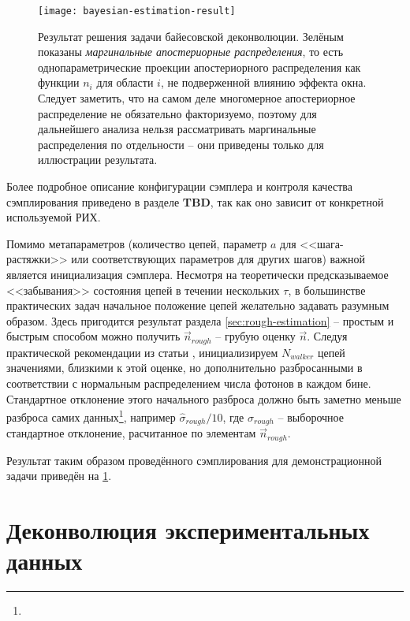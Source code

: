 \begin{figure}
	\centering
	\texttt{[image: bayesian-estimation-result]}
	\caption{Результат решения задачи байесовской деконволюции. Зелёным показаны \textit{маргинальные апостериорные распределения}, то есть однопараметрические проекции апостериорного распределения как функции $n_i$ для области $i$, не подверженной влиянию эффекта окна. Следует заметить, что на самом деле многомерное апостериорное распределение не обязательно факторизуемо, поэтому для дальнейшего анализа нельзя рассматривать маргинальные распределения по отдельности -- они приведены только для иллюстрации результата.}
	\label{pic:bayesian-estimation}
\end{figure}

Более подробное описание конфигурации сэмплера и контроля качества сэмплирования приведено в разделе \textbf{TBD}, так как оно зависит от конкретной используемой РИХ.

Помимо метапараметров (количество цепей, параметр $a$ для <<шага-растяжки>> или соответствующих параметров для других шагов) важной является инициализация сэмплера. Несмотря на теоретически предсказываемое <<забывания>> состояния цепей в течении нескольких $\tau$, в большинстве практических задач начальное положение цепей желательно задавать разумным образом. Здесь пригодится результат раздела \ref{sec:rough-estimation} -- простым и быстрым способом можно получить $\vec{n}_{rough}$ -- грубую оценку $\vec{n}$. Следуя практической рекомендации из статьи \cite{ForemanMackey2016}, инициализируем $N_{walker}$ цепей значениями, близкими к этой оценке, но дополнительно разбросанными в соответствии с нормальным распределением числа фотонов в каждом бине. Стандартное отклонение этого начального разброса должно быть заметно меньше разброса самих данных\footnote{}, например $\hat{\sigma}_{rough} / 10$, где $\hat{\sigma}_{rough}$ -- выборочное стандартное отклонение, расчитанное по элементам $\vec{n}_{rough}$.

Результат таким образом проведённого сэмплирования для демонстрационной задачи приведён на \ref{pic:bayesian-estimation}.



\section{Деконволюция экспериментальных данных}

